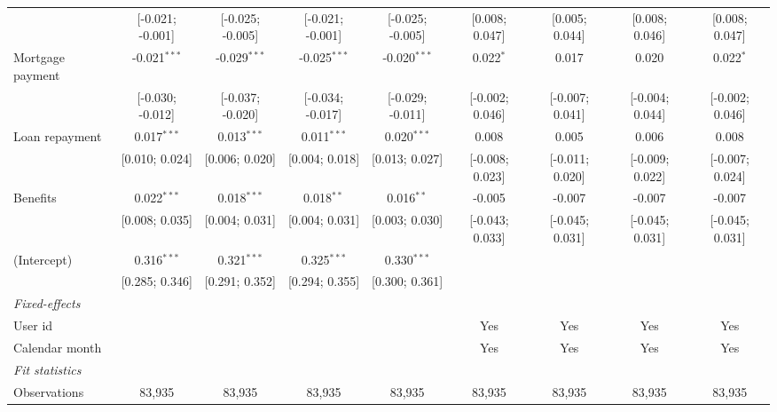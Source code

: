 \begin{table}[htbp]
\begin{threeparttable}[b]
\begin{tabular}{lcccccccc}
                                & [-0.021; -0.001] & [-0.025; -0.005] & [-0.021; -0.001] & [-0.025; -0.005] & [0.008; 0.047]  & [0.005; 0.044]  & [0.008; 0.046]  & [0.008; 0.047]\\   
         Mortgage payment       & -0.021$^{***}$   & -0.029$^{***}$   & -0.025$^{***}$   & -0.020$^{***}$   & 0.022$^{*}$     & 0.017           & 0.020           & 0.022$^{*}$\\   
                                & [-0.030; -0.012] & [-0.037; -0.020] & [-0.034; -0.017] & [-0.029; -0.011] & [-0.002; 0.046] & [-0.007; 0.041] & [-0.004; 0.044] & [-0.002; 0.046]\\   
         Loan repayment         & 0.017$^{***}$    & 0.013$^{***}$    & 0.011$^{***}$    & 0.020$^{***}$    & 0.008           & 0.005           & 0.006           & 0.008\\   
                                & [0.010; 0.024]   & [0.006; 0.020]   & [0.004; 0.018]   & [0.013; 0.027]   & [-0.008; 0.023] & [-0.011; 0.020] & [-0.009; 0.022] & [-0.007; 0.024]\\   
         Benefits               & 0.022$^{***}$    & 0.018$^{***}$    & 0.018$^{**}$     & 0.016$^{**}$     & -0.005          & -0.007          & -0.007          & -0.007\\   
                                & [0.008; 0.035]   & [0.004; 0.031]   & [0.004; 0.031]   & [0.003; 0.030]   & [-0.043; 0.033] & [-0.045; 0.031] & [-0.045; 0.031] & [-0.045; 0.031]\\   
         (Intercept)            & 0.316$^{***}$    & 0.321$^{***}$    & 0.325$^{***}$    & 0.330$^{***}$    &                 &                 &                 &   \\   
                                & [0.285; 0.346]   & [0.291; 0.352]   & [0.294; 0.355]   & [0.300; 0.361]   &                 &                 &                 &   \\   
         \midrule
         \emph{Fixed-effects}\\
         User id                &                  &                  &                  &                  & Yes             & Yes             & Yes             & Yes\\  
         Calendar month         &                  &                  &                  &                  & Yes             & Yes             & Yes             & Yes\\  
         \midrule
         \emph{Fit statistics}\\
         Observations           & 83,935           & 83,935           & 83,935           & 83,935           & 83,935          & 83,935          & 83,935          & 83,935\\  

\end{tabular}
\end{threeparttable}
\end{table}
